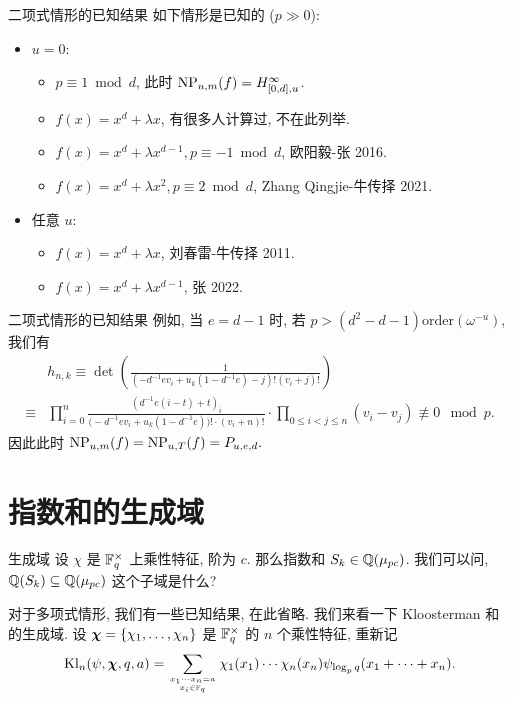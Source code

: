 \documentclass[aspectratio=169,handout]{ctexbeamer}
\newcommand\bchi{{\boldsymbol\chi}}
\begin{document}
\begin{frame}{二项式情形的已知结果}
如下情形是已知的 ($p\gg0$):
\begin{itemize}
\item $u=0$:
\begin{itemize}
\item $p\equiv 1\bmod d$, 此时 ${\mathrm{NP}}_{u,m}(f)=H_{[0,d],u}^\infty$.
\item $f(x)=x^d+\lambda x$, 有很多人计算过, 不在此列举.
\item $f(x)=x^d+\lambda x^{d-1},p\equiv -1\bmod d$, 欧阳毅-张 2016.
\item $f(x)=x^d+\lambda x^2,p\equiv 2\bmod d$, Zhang Qingjie-牛传择 2021.
\end{itemize}
\item 任意 $u$:
\begin{itemize}
	\item $f(x)=x^d+\lambda x$, 刘春雷-牛传择 2011.
	\item $f(x)=x^d+\lambda x^{d-1}$, 张 2022.
\end{itemize}
\end{itemize}
\end{frame}


\begin{frame}{二项式情形的已知结果}
例如, 当 $e=d-1$ 时, 若 $p>(d^2-d-1)\mathrm{order}(\omega^{-u})$, 我们有
	\[\begin{split}
	&h_{n,k}\equiv\det\left(\frac{1}{(-d^{-1}ev_i+u_k(1-d^{-1}e)-j)!(v_i+j)!}\right)\\
\equiv &\prod_{i=0}^n \frac{\left(d^{-1}e(i-t)+t\right)_i}{\bigl(-d^{-1}ev_i+u_k(1-d^{-1}e)\bigr)!\cdot(v_i+n)!} \cdot \prod_{0\le i<j\le n}(v_i-v_j)\not\equiv 0\mod p.
\end{split}\]
因此此时 ${\mathrm{NP}}_{u,m}(f)={\mathrm{NP}}_{u,T}(f)=P_{u,e,d}.$
\end{frame}



\section{指数和的生成域}



\begin{frame}{生成域}
设 $\chi$ 是 ${\mathbb{F}}_q^\times$ 上乘性特征, 阶为 $c$.
那么指数和 $S_k\in{\mathbb{Q}}(\mu_{pc})$.
我们可以问, ${\mathbb{Q}}(S_k)\subseteq {\mathbb{Q}}(\mu_{pc})$ 这个子域是什么?

对于多项式情形, 我们有一些已知结果, 在此省略.
我们来看一下 Kloosterman 和的生成域.
设 $\bchi=\set{\chi_1,\dots,\chi_n}$ 是 ${\mathbb{F}}_q^\times$ 的 $n$ 个乘性特征, 重新记
\[\Kl_n(\psi,\bchi,q,a)=\sum_{x_1\cdots x_n=a\atop x_i\in\BF_{q}}\chi_1(x_1)\cdots\chi_n(x_n)\psi_{\log_p q}(x_1+\cdots+x_n).\]
\end{frame}
\end{document}
